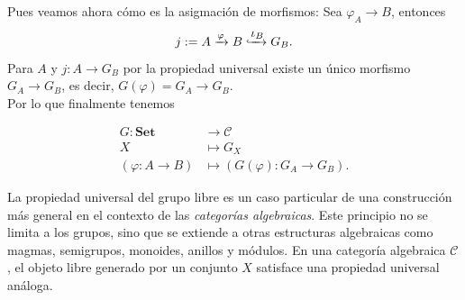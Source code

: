 




Pues veamos ahora cómo es la asigmación de morfismos:  Sea $\varphi_ A\to B $, entonces $$  j:=A \xrightarrow{ \varphi} B \xhookrightarrow{\displaystyle \iota_B} G_B .$$ Para $A$ y $j: A\to G_B$ por la propiedad universal existe un único morfismo $G_A\to G_B$, es decir, $G(\varphi)=G_A \to G_B$.\\

\noindent Por lo que finalmente tenemos 


\[
\begin{aligned}
	G:\mathbf{Set} & \longrightarrow \mathcal{C}  \\
	X & \longmapsto G_X \\
	\left(\varphi : A\to B \right)& \longmapsto \left(G(\varphi) : G_A \to G_B\right) .
\end{aligned}
\]

\vspace{1cm}
La propiedad universal del grupo libre es un caso particular de una construcción más general en el contexto de las \emph{categorías algebraicas}. Este principio no se limita a los grupos, sino que se extiende a otras estructuras algebraicas como magmas, semigrupos, monoides, anillos y módulos. En una categoría algebraica \( \mathcal{C} \), el objeto libre generado por un conjunto \( X \) satisface una propiedad universal análoga.


\begin{proposicion}
\end{proposicion}


